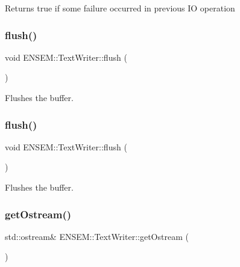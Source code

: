 \begin{DoxyReturn}{Returns}
true if some failure occurred in previous IO operation 
\end{DoxyReturn}
\mbox{\label{classENSEM_1_1TextWriter_a6062726c44aa7c500a065a416ae03a67}} 
\subsubsection{\texorpdfstring{flush()}{flush()}\hspace{0.1cm}{\footnotesize\ttfamily [1/2]}}
{\footnotesize\ttfamily void E\+N\+S\+E\+M\+::\+Text\+Writer\+::flush (\begin{DoxyParamCaption}{ }\end{DoxyParamCaption})}



Flushes the buffer. 

\mbox{\label{classENSEM_1_1TextWriter_a6062726c44aa7c500a065a416ae03a67}} 
\subsubsection{\texorpdfstring{flush()}{flush()}\hspace{0.1cm}{\footnotesize\ttfamily [2/2]}}
{\footnotesize\ttfamily void E\+N\+S\+E\+M\+::\+Text\+Writer\+::flush (\begin{DoxyParamCaption}{ }\end{DoxyParamCaption})}



Flushes the buffer. 

\mbox{\label{classENSEM_1_1TextWriter_a40ade2e6c44ba267efdce5fb70909362}} 
\subsubsection{\texorpdfstring{getOstream()}{getOstream()}\hspace{0.1cm}{\footnotesize\ttfamily [1/2]}}
{\footnotesize\ttfamily std\+::ostream\& E\+N\+S\+E\+M\+::\+Text\+Writer\+::get\+Ostream (\begin{DoxyParamCaption}{ }\end{DoxyParamCaption})\hspace{0.3cm}{\ttfamily [inline]}}



